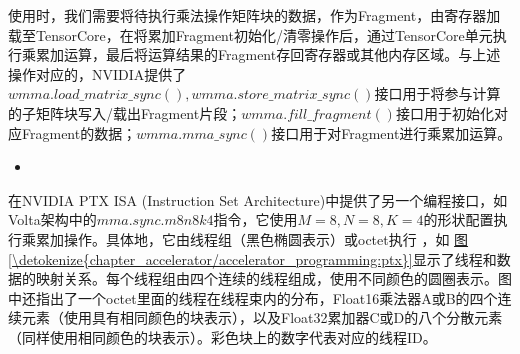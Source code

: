 \documentclass[letterpaper,10pt,english]{sphinxmanual}
\begin{document}
\begin{sphinxVerbatim}[commandchars=\\\{\}]
\end{sphinxVerbatim}

\sphinxAtStartPar
使用时，我们需要将待执行乘法操作矩阵块的数据，作为Fragment，由寄存器加载至TensorCore，在将累加Fragment初始化/清零操作后，通过TensorCore单元执行乘累加运算，最后将运算结果的Fragment存回寄存器或其他内存区域。与上述操作对应的，NVIDIA提供了\(wmma.load\_matrix\_sync(), wmma.store\_matrix\_sync()\)接口用于将参与计算的子矩阵块写入/载出Fragment片段；\(wmma.fill\_fragment()\)接口用于初始化对应Fragment的数据；\(wmma.mma\_sync()\)接口用于对Fragment进行乘累加运算。
\begin{itemize}
\item {} 
\sphinxAtStartPar
{}

\end{itemize}

\sphinxAtStartPar
在NVIDIA PTX ISA (Instruction Set
Architecture)中提供了另一个编程接口，如Volta架构中的\(mma.sync.m8n8k4\)指令，它使用\(M=8, N=8, K=4\)的形状配置执行乘累加操作。具体地，它由线程组（黑色椭圆表示）或octet执行
，如
\hyperref[\detokenize{chapter_accelerator/accelerator_programming:ptx}]{图\ref{\detokenize{chapter_accelerator/accelerator_programming:ptx}}}显示了线程和数据的映射关系。每个线程组由四个连续的线程组成，使用不同颜色的圆圈表示。图中还指出了一个octet里面的线程在线程束内的分布，Float16乘法器A或B的四个连续元素（使用具有相同颜色的块表示），以及Float32累加器C或D的八个分散元素（同样使用相同颜色的块表示）。彩色块上的数字代表对应的线程ID。
\end{document}
